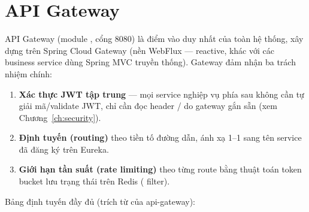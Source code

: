 \documentclass[12pt,a4paper]{report}
\begin{document}
\section{API Gateway}

API Gateway (module , cổng 8080) là điểm vào duy nhất
của toàn hệ thống, xây dựng trên Spring Cloud Gateway (nền WebFlux — reactive,
khác với các business service dùng Spring MVC truyền thống). Gateway đảm nhận
ba trách nhiệm chính:

\begin{enumerate}[nosep]
    \item \textbf{Xác thực JWT tập trung} — mọi service nghiệp vụ phía sau
    không cần tự giải mã/validate JWT, chỉ cần đọc header  /
     do gateway gắn sẵn (xem Chương~\ref{ch:security}).
    \item \textbf{Định tuyến (routing)} theo tiền tố đường dẫn, ánh xạ 1--1
    sang tên service đã đăng ký trên Eureka.
    \item \textbf{Giới hạn tần suất (rate limiting)} theo từng route bằng
    thuật toán token bucket lưu trạng thái trên Redis
    ( filter).
\end{enumerate}

Bảng định tuyến đầy đủ (trích từ  của api-gateway):
\end{document}
